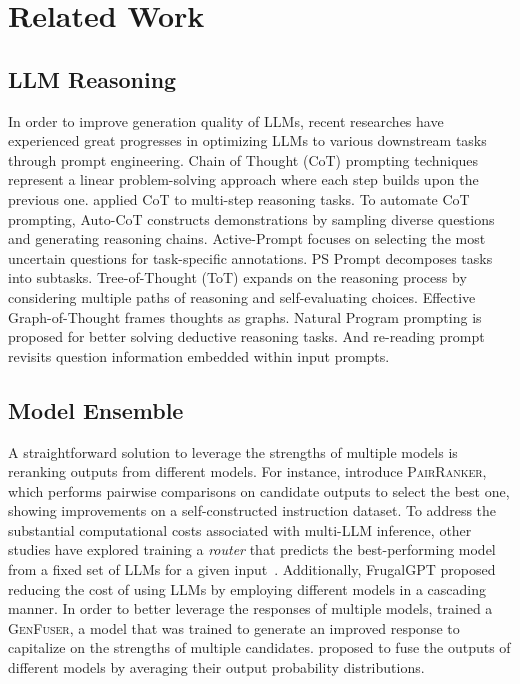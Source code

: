 \documentclass{article}
\begin{document}

\section{Related Work}
\label{section:related_work}

\subsection{LLM Reasoning}

In order to improve generation quality of LLMs, 
recent researches have experienced great progresses in optimizing LLMs to various downstream tasks through prompt engineering.
Chain of Thought (CoT) \citep{cot, cot0} prompting techniques represent a linear problem-solving approach where each step builds upon the previous one.
\citet{firstms} applied CoT to multi-step reasoning tasks. 
To automate CoT prompting, Auto-CoT \citep{autop} constructs demonstrations by sampling diverse questions and generating reasoning chains. 
Active-Prompt \citep{activep}  focuses on selecting the most uncertain questions for task-specific annotations.
PS Prompt \citep{pas} decomposes tasks into subtasks.
Tree-of-Thought (ToT) \citep{tot} expands on the reasoning process by considering multiple paths of reasoning and self-evaluating choices.
Effective Graph-of-Thought \citep{eGoT} frames thoughts as graphs.
Natural Program prompting \citep{np} is proposed for better solving deductive reasoning tasks.
And re-reading prompt \citep{reread} revisits question information embedded within input prompts.

\subsection{Model Ensemble}

A straightforward solution to leverage the strengths of multiple models is reranking outputs from different models.
For instance, \citet{jiang-etal-2023-llm} introduce \textsc{PairRanker}, 
which performs pairwise comparisons on candidate outputs to select the best one, showing improvements on a self-constructed instruction dataset. 
To address the substantial computational costs associated with multi-LLM inference, 
other studies have explored training a \textit{router} that predicts the best-performing model from a fixed set of LLMs for a given input~\citep{wang2024fusing,shnitzer2024large,lu2023routing}.
Additionally, FrugalGPT \citep{chen2023frugalgpt} proposed reducing the cost of using LLMs by employing different models in a cascading manner.
In order to better leverage the responses of multiple models,
\citet{jiang-etal-2023-llm} trained a \textsc{GenFuser}, 
a model that was trained to generate an improved response to capitalize on the strengths of multiple candidates.
\citet{huang2024enabling} proposed to fuse the outputs of different models by averaging their output probability distributions.
\end{document}
